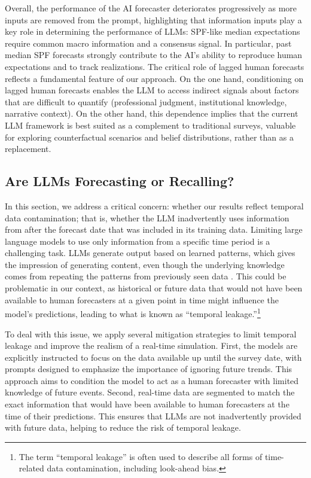 \documentclass[11pt,letterpaper]{scrartcl}
\begin{document}
Overall, the performance of the AI forecaster deteriorates progressively as more inputs are removed from the prompt, highlighting that information inputs play a key role in determining the performance of LLMs: SPF-like median expectations require common macro information and a consensus signal. In particular, past median SPF forecasts strongly contribute to the AI's ability to reproduce human expectations and to track realizations. 
The critical role of lagged human forecasts reflects a fundamental feature of our approach. On the one hand, conditioning on lagged 
human forecasts enables the LLM to access indirect signals about factors that are 
difficult to quantify (professional judgment, institutional knowledge, narrative 
context). On the other hand, this dependence implies that the current LLM framework is best suited as a complement to traditional surveys, valuable for exploring counterfactual scenarios and belief distributions, rather than as a replacement.



\subsection{Are LLMs Forecasting or Recalling?}\label{sec:forecast_or_recall}

In this section, we address a critical concern: whether our results reflect temporal data contamination; that is, whether the LLM inadvertently uses information from after the forecast date that was included in its training data. 
Limiting large language models to use only information from a specific time period is a challenging task. LLMs generate output based on learned patterns, which gives the impression of generating content, even though the underlying knowledge comes from repeating the patterns from previously seen data \citep{gurnee2023language}. This could be problematic in our context, as historical or future data that would not have been available to human forecasters at a given point in time might influence the model's predictions, leading to what is known as ``temporal leakage.''\footnote{The term ``temporal leakage'' is often used to describe all forms of time-related data contamination, including look-ahead bias.}

To deal with this issue, we apply several mitigation strategies to limit temporal leakage and improve the realism of a real-time simulation. First, the models are explicitly instructed to focus on the data available up until the survey date, with prompts designed to emphasize the importance of ignoring future trends. This approach aims to condition the model to act as a human forecaster with limited knowledge of future events. Second, real-time data are segmented to match the exact information that would have been available to human forecasters at the time of their predictions. This ensures that LLMs are not inadvertently provided with future data, helping to reduce the risk of temporal leakage.
\end{document}
